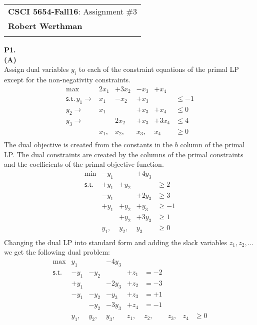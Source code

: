\documentclass[11pt]{article}
\begin{document}
\begin{tabular}{l}
\textbf{CSCI 5654-Fall16}: Assignment \#3 \\
\textbf{Robert Werthman} \phantom{Supercalifragilisticexpialidocius Smith}\\
\hline
\\[10pt]
\end{tabular}

\noindent
\textbf{P1.}
\\
\noindent\textbf{(A)}
\\
Assign dual variables $y_i$ to each of the constraint equations of the primal LP except for the non-negativity constraints.
\[ \begin{array}{rllllll}
\max & 2 x_1  & + 3 x_2 & - x_3 & + x_4 \\
\mathsf{s.t.}\, y_1 \rightarrow & x_1 & - x_2 & + x_3 &   & \leq  -1 \\
y_2 \rightarrow & x_1 &  & + x_3 & + x_4 & \leq 0 \\
y_3 \rightarrow &    & 2 x_2 & + x_3 & + 3 x_4 & \leq  4 \\
& x_1, & x_2, & x_3, & x_4 & \geq  0 \\
\end{array}\]
The dual objective is created from the constants in the $b$ column of the primal LP.  The dual constraints are created by the columns of the primal constraints and the coefficients of the primal objective function.
\[\begin{array}{rllllll}
\min & -y_1 & & +4y_3 \\
\mathsf{s.t.} 
& +y_1 & +y_2 & & \geq 2 \\
& -y_1 & & +2y_3 & \geq 3 \\
& +y_1 & +y_2 & +y_3 & \geq -1 \\
& & +y_2 & +3y_3 & \geq 1 \\
& y_1, & y_2, & y_3 & \geq 0 \\
\end{array}\]
Changing the dual LP into standard form and adding the slack variables $z_1, z_2, \ldots$ we get the following dual problem:
\[\begin{array}{rllllllll}
\max & y_1 & & -4y_3 \\
\mathsf{s.t.} 
& -y_1 & -y_2 & & +z_1 & = -2 \\
& +y_1 & & -2y_3 & +z_2 & = -3 \\
& -y_1 & -y_2 & -y_3 & +z_3 & = +1 \\
& & -y_2 & -3y_3 & +z_4 & = -1 \\
& y_1, & y_2, & y_3, & z_1, & z_2, & z_3, & z_4 & \geq 0 \\
\end{array}\]
\end{document}

